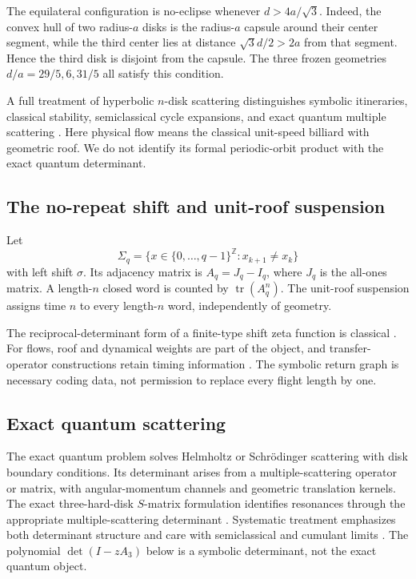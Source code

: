 \documentclass[11pt,a4paper]{article}
\theoremstyle{definition}
\theoremstyle{remark}
\newcommand{\tr}{\operatorname{tr}}
\begin{document}
The equilateral configuration is no-eclipse whenever \(d>4a/\sqrt3\).
Indeed, the convex hull of two radius-\(a\) disks is the radius-\(a\)
capsule around their center segment, while the third center lies at distance
\(\sqrt3d/2>2a\) from that segment.  Hence the third disk is disjoint from
the capsule.  The three frozen geometries \(d/a=29/5,6,31/5\) all satisfy
this condition.

A full treatment of hyperbolic \(n\)-disk scattering distinguishes symbolic itineraries, classical stability, semiclassical cycle expansions, and exact quantum multiple scattering \citep[Secs.~2--4]{Wirzba1999}. Here physical flow means the classical unit-speed billiard with geometric roof. We do not identify its formal periodic-orbit product with the exact quantum determinant.

\subsection{The no-repeat shift and unit-roof suspension}

Let
\[
 \Sigma_q=\{x\in\{0,\ldots,q-1\}^{\mathbb Z}:x_{k+1}\ne x_k\}
\]
with left shift \(\sigma\). Its adjacency matrix is \(A_q=J_q-I_q\), where \(J_q\) is the all-ones matrix. A length-\(n\) closed word is counted by \(\tr(A_q^n)\). The unit-roof suspension assigns time \(n\) to every length-\(n\) word, independently of geometry.

The reciprocal-determinant form of a finite-type shift zeta function is classical \citep[pp.~43--49]{BowenLanford1970}.
For flows, roof and dynamical weights are part of the object, and transfer-operator constructions retain timing information \citep[Secs.~1--3]{Ruelle1976}. The symbolic return graph is necessary coding data, not permission to replace every flight length by one.

\subsection{Exact quantum scattering}

The exact quantum problem solves Helmholtz or Schrödinger scattering with disk boundary conditions. Its determinant arises from a multiple-scattering operator or matrix, with angular-momentum channels and geometric translation kernels.
The exact three-hard-disk \(S\)-matrix formulation identifies resonances through the appropriate multiple-scattering determinant \citep[abstract and Secs.~II--III]{GaspardRice1989Exact}.
Systematic treatment emphasizes both determinant structure and care with semiclassical and cumulant limits \citep[Secs.~4--6]{Wirzba1999}. The polynomial \(\det(I-zA_3)\) below is a symbolic determinant, not the exact quantum object.
\end{document}
